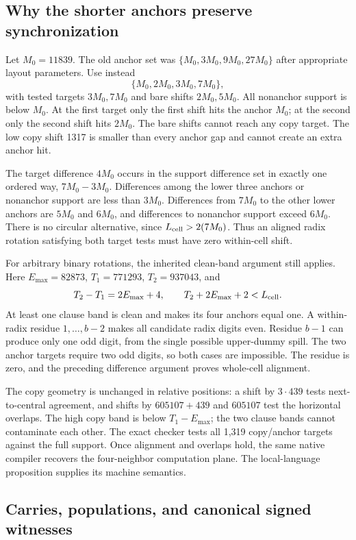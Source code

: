 \subsection{Why the shorter anchors preserve synchronization}

Let $M_0=11839$.  The old anchor set was
$\{M_0,3M_0,9M_0,27M_0\}$ after appropriate layout parameters.
Use instead
\[
\{M_0,2M_0,3M_0,7M_0\},
\]
with tested targets $3M_0,7M_0$ and bare shifts $2M_0,5M_0$.
All nonanchor support is below $M_0$.
At the first target only the first shift hits the anchor $M_0$;
at the second only the second shift hits $2M_0$.
The bare shifts cannot reach any copy target.  The low copy shift 1317
is smaller than every anchor gap and cannot create an extra anchor hit.

The target difference $4M_0$ occurs in the support difference set
in exactly one ordered way, $7M_0-3M_0$.
Differences among the lower three anchors or nonanchor support are less
than $3M_0$.  Differences from $7M_0$ to the other lower anchors are
$5M_0$ and $6M_0$, and differences to nonanchor support exceed
$6M_0$.  There is no circular alternative, since
$L_{\rm cell}>2(7M_0)$.  Thus an aligned radix rotation satisfying
both target tests must have zero within-cell shift.

For arbitrary binary rotations, the inherited clean-band argument
still applies.  Here $E_{\max}=82873$, $T_1=771293$, $T_2=937043$, and
\[
T_2-T_1=2E_{\max}+4,\qquad
T_2+2E_{\max}+2<L_{\rm cell}.
\]
At least one clause band is clean and makes its four anchors equal
one.  A within-radix residue $1,\ldots,b-2$ makes all candidate radix
digits even.  Residue $b-1$ can produce only one odd digit, from the
single possible upper-dummy spill.  The two anchor targets require two
odd digits, so both cases are impossible.  The residue is zero, and
the preceding difference argument proves whole-cell alignment.

The copy geometry is unchanged in relative positions: a shift by
$3\cdot439$ tests next-to-central agreement, and shifts by $605107+439$
and $605107$ test the horizontal overlaps.  The high copy band is below
$T_1-E_{\max}$; the two clause bands cannot contaminate each other.
The exact checker tests all 1,319 copy/anchor targets against the full
support.  Once alignment and overlaps hold, the same native compiler
recovers the four-neighbor computation plane.  The local-language
proposition supplies its machine semantics.

\subsection{Carries, populations, and canonical signed witnesses}

